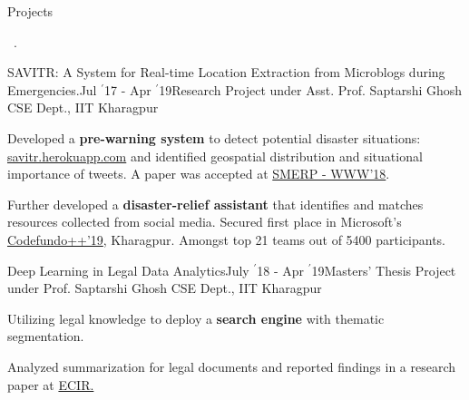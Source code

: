 \documentclass[11pt, a4paper]{resume}
\newcommand{\important}[1]{
	\textcolor{mypurple}{#1}
}
\newcommand{\fillit}[1]{
	\leavevmode\xleaders\hbox{#1}\hfill\kern0pt
}
\newcommand{\sectionSubtitleX}[1]{
	\begin{large}
    \important{#1}
    \end{large}
    \fillit{\important{.}}
}
\begin{document}
\sectionSubtitleX{Projects}

\begin{rSubsection}{SAVITR: A System for Real-time Location Extraction from Microblogs during Emergencies.}{Jul $^{\prime}$17 - Apr $^{\prime}$19}{Research Project under Asst. Prof. Saptarshi Ghosh}{\hspace*{\fill} CSE Dept., IIT Kharagpur}
\item Developed a {\bf pre-warning system} to detect potential disaster situations: \href{http://savitr.herokuapp.com}{savitr.herokuapp.com} and identified geospatial distribution and situational importance of tweets. A paper was accepted at \href{https://www.cse.iitk.ac.in/users/kripa/smerp2018/}{SMERP - WWW'18}.
\item Further developed a {\bf disaster-relief assistant} that identifies and matches resources collected from social media. Secured first place in Microsoft's \href{https://drive.google.com/open?id=1bcVOIePJl6ahP0JRqtrUgSZdXo2LQaLb}{Codefundo++'19}, Kharagpur. Amongst top 21 teams out of 5400 participants.
\end{rSubsection}


\begin{rSubsection}{Deep Learning in Legal Data Analytics}{July $^{\prime}$18 - Apr $^{\prime}$19}{Masters' Thesis Project under Prof. Saptarshi Ghosh}{\hspace*{\fill} CSE Dept., IIT Kharagpur}
\item Utilizing legal knowledge to deploy a \textbf{search engine} with thematic segmentation.
\item Analyzed summarization for legal documents and reported findings in a research paper at \href{http://ecir2019.org}{ECIR.}
\end{rSubsection}
\end{document}
